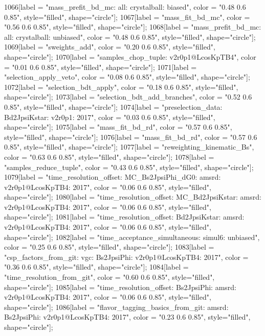 {	1066[label = "mass_prefit_bd_mc\nmassbin: all\nmassmodel: crystalball\ntrigger: biased", color = "0.48 0.6 0.85", style="filled", shape="circle"];
	1067[label = "mass_fit_bd_mc", color = "0.56 0.6 0.85", style="filled", shape="circle"];
	1068[label = "mass_prefit_bd_mc\nmassbin: all\nmassmodel: crystalball\ntrigger: unbiased", color = "0.48 0.6 0.85", style="filled", shape="circle"];
	1069[label = "sweights_add", color = "0.20 0.6 0.85", style="filled", shape="circle"];
	1070[label = "samples_chop_tuple\nversion: v2r0p1@LcosKpTB4", color = "0.01 0.6 0.85", style="filled", shape="circle"];
	1071[label = "selection_apply_veto", color = "0.08 0.6 0.85", style="filled", shape="circle"];
	1072[label = "selection_bdt_apply", color = "0.18 0.6 0.85", style="filled", shape="circle"];
	1073[label = "selection_bdt_add_branches", color = "0.52 0.6 0.85", style="filled", shape="circle"];
	1074[label = "preselection_data\nmode: Bd2JpsiKstar\nversion: v2r0p1\nyear: 2017", color = "0.03 0.6 0.85", style="filled", shape="circle"];
	1075[label = "mass_fit_bd_rd", color = "0.57 0.6 0.85", style="filled", shape="circle"];
	1076[label = "mass_fit_bd_rd", color = "0.57 0.6 0.85", style="filled", shape="circle"];
	1077[label = "reweighting_kinematic_Bs", color = "0.63 0.6 0.85", style="filled", shape="circle"];
	1078[label = "samples_reduce_tuple", color = "0.43 0.6 0.85", style="filled", shape="circle"];
	1079[label = "time_resolution_offset\nmode: MC_Bs2JpsiPhi_dG0\ntimeres: amsrd\nversion: v2r0p1@LcosKpTB4\nyear: 2017", color = "0.06 0.6 0.85", style="filled", shape="circle"];
	1080[label = "time_resolution_offset\nmode: MC_Bd2JpsiKstar\ntimeres: amsrd\nversion: v2r0p1@LcosKpTB4\nyear: 2017", color = "0.06 0.6 0.85", style="filled", shape="circle"];
	1081[label = "time_resolution_offset\nmode: Bd2JpsiKstar\ntimeres: amsrd\nversion: v2r0p1@LcosKpTB4\nyear: 2017", color = "0.06 0.6 0.85", style="filled", shape="circle"];
	1082[label = "time_acceptance_simultaneous\ntimeacc: simul6\ntrigger: unbiased", color = "0.25 0.6 0.85", style="filled", shape="circle"];
	1083[label = "csp_factors_from_git\ncsp: vgc\nmode: Bs2JpsiPhi\nversion: v2r0p1@LcosKpTB4\nyear: 2017", color = "0.36 0.6 0.85", style="filled", shape="circle"];
	1084[label = "time_resolution_from_git", color = "0.60 0.6 0.85", style="filled", shape="circle"];
	1085[label = "time_resolution_offset\nmode: Bs2JpsiPhi\ntimeres: amsrd\nversion: v2r0p1@LcosKpTB4\nyear: 2017", color = "0.06 0.6 0.85", style="filled", shape="circle"];
	1086[label = "flavor_tagging_basics_from_git\nflavor: amsrd\nmode: Bs2JpsiPhi\nversion: v2r0p1@LcosKpTB4\nyear: 2017", color = "0.23 0.6 0.85", style="filled", shape="circle"];
}
